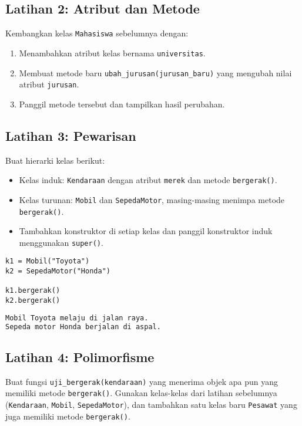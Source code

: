 \subsection*{Latihan 2: Atribut dan Metode}
Kembangkan kelas \texttt{Mahasiswa} sebelumnya dengan:
\begin{enumerate}
    \item Menambahkan atribut kelas bernama \texttt{universitas}.
    \item Membuat metode baru \texttt{ubah\_jurusan(jurusan\_baru)} yang mengubah nilai atribut \texttt{jurusan}.
    \item Panggil metode tersebut dan tampilkan hasil perubahan.
\end{enumerate}

\subsection*{Latihan 3: Pewarisan}
Buat hierarki kelas berikut:
\begin{itemize}
    \item Kelas induk: \texttt{Kendaraan} dengan atribut \texttt{merek} dan metode \texttt{bergerak()}.
    \item Kelas turunan: \texttt{Mobil} dan \texttt{SepedaMotor}, masing-masing menimpa metode \texttt{bergerak()}.
    \item Tambahkan konstruktor di setiap kelas dan panggil konstruktor induk menggunakan \texttt{super()}.
\end{itemize}

\begin{lstlisting}[style=PythonStyle, caption={Contoh penggunaan}]
k1 = Mobil("Toyota")
k2 = SepedaMotor("Honda")

k1.bergerak()
k2.bergerak()
\end{lstlisting}

\begin{lstlisting}[language=bash, caption={Output Program}]
Mobil Toyota melaju di jalan raya.
Sepeda motor Honda berjalan di aspal.
\end{lstlisting}

\subsection*{Latihan 4: Polimorfisme}
Buat fungsi \texttt{uji\_bergerak(kendaraan)} yang menerima objek apa pun yang memiliki metode \texttt{bergerak()}.  
Gunakan kelas-kelas dari latihan sebelumnya (\texttt{Kendaraan}, \texttt{Mobil}, \texttt{SepedaMotor}), dan tambahkan satu kelas baru \texttt{Pesawat} yang juga memiliki metode \texttt{bergerak()}.

